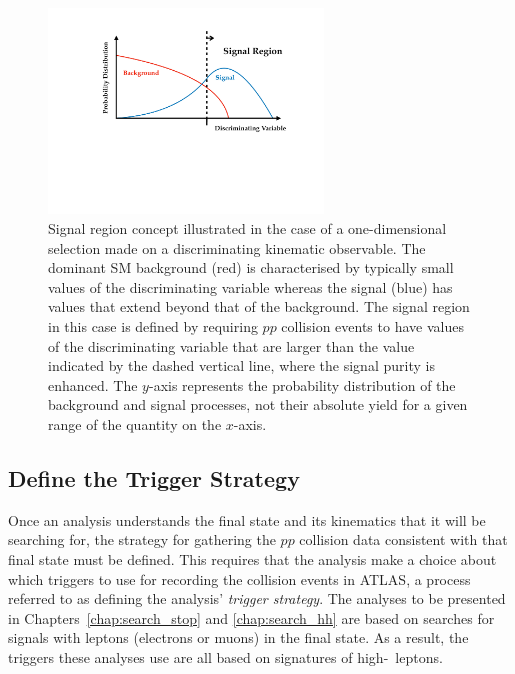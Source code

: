 \begin{figure}[!htb]
    \begin{center}
        \includegraphics[width=0.65\textwidth]{figures/common_ana/sr_search_vPDF}
        \caption{
            Signal region concept illustrated in the case of a one-dimensional selection
            made on a discriminating kinematic observable.
            The dominant SM background (red) is characterised by typically small values
            of the discriminating variable whereas the signal (blue) has values that extend
            beyond that of the background.
            The signal region in this case is defined by requiring $pp$ collision events
            to have values of the discriminating variable that are larger than
            the value indicated by the dashed vertical line, where the signal purity is
            enhanced.
            The $y$-axis represents the probability distribution of the background and signal
            processes, not their absolute yield for a given range of the quantity on the $x$-axis.
        }
        \label{fig:sr_search_v}
    \end{center}
\end{figure}



\FloatBarrier
\subsection{Define the Trigger Strategy}
\label{sec:gather_data}

Once an analysis understands the final state and its kinematics that it will be searching for,
the strategy for gathering the $pp$ collision data consistent with that final state must be defined.
This requires that the analysis make a choice about which triggers to use for recording
the collision events in ATLAS, a process referred to as defining the analysis' \textit{trigger strategy}.
The analyses to be presented in Chapters~\ref{chap:search_stop} and \ref{chap:search_hh} are based
on searches for signals with leptons (electrons or muons) in the final state.
As a result, the triggers these analyses use are all based on signatures of high-\pT~leptons.

